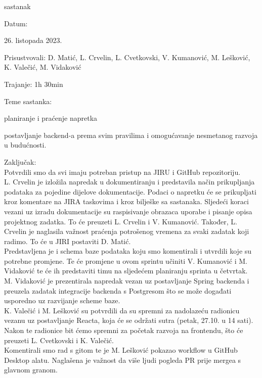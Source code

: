 \begin{packed_enum}
            \item  sastanak
			\item[] \begin{packed_item}
				\item Datum: \date[{26. listopada 2023.}
				\item Prisustvovali: D. Matić, L. Crvelin, L. Cvetkovski, V. Kumanović, M. Lešković, K. Valečić, M. Vidaković 
				\item Trajanje: 1h 30min
				\item Teme sastanka:
				\begin{packed_item}
					\item  planiranje i praćenje napretka
					\item  postavljanje backend-a prema svim pravilima i omogućavanje nesmetanog razvoja u budućnosti.
				\end{packed_item}
            \item Zaključak: \\
            Potvrdili smo da svi imaju potreban pristup na JIRU i GitHub repozitoriju. \\
             L. Crvelin je izložila napredak u dokumentiranju i predstavila način prikupljanja podataka za pojedine dijelove dokumentacije. Podaci o napretku će se prikupljati kroz komentare na JIRA taskovima i kroz bilješke sa sastanaka. Sljedeći koraci vezani uz izradu dokumentacije su raspisivanje obrazaca uporabe i pisanje opisa projektnog zadatka. To će preuzeti L. Crvelin i V. Kumanović. Također, L. Crvelin je naglasila važnost praćenja potrošenog vremena za svaki zadatak koji radimo. To će u JIRI postaviti D. Matić. \\
             Predstavljena je i schema baze podataka koju smo komentirali i utvrdili koje su potrebne promjene. Te će promjene u ovom sprintu učiniti V. Kumanović i M. Vidaković te će ih predstaviti timu na sljedećem planiranju sprinta u četvrtak. \\
             M. Vidaković je prezentirala napredak vezan uz postavljanje Spring backenda i preuzela zadatak integracije backenda s Postgresom što se može događati usporedno uz razvijanje scheme baze. \\
             K. Valečić i M. Lešković su potvrdili da su spremni za nadolazeću radionicu vezanu uz postavljanje Reacta, koja će se održati sutra (petak, 27.10. u 14 sati). Nakon te radionice bit ćemo spremni za početak razvoja na frontendu, što će preuzeti L. Cvetkovski i K. Valečić. \\
             Komentirali smo rad s gitom te je M. Lešković pokazao workflow u GitHub Desktop alatu. Naglašena je važnost da više ljudi pogleda PR prije mergea s glavnom granom.
            

\end{packed_item}
\end{packed_enum}
